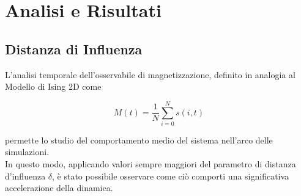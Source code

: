 \documentclass[letterpaper,10pt]{article}
\begin{document}
\section{Analisi e Risultati}
\label{Sec:4}

\subsection{Distanza di Influenza}
\label{Sec:4.1}

L'analisi temporale dell'osservabile di magnetizzazione, definito in analogia al Modello di Ising 2D come

\begin{equation}
M(t) = \dfrac{1}{N} \sum_{i = 0}^{N} s(i,t)
\label{Eq:10}
\end{equation}

permette lo studio del comportamento medio del sistema nell'arco delle simulazioni.
\\ In questo modo, applicando valori sempre maggiori del parametro di distanza d'influenza $\delta$, è stato possibile osservare come ciò comporti una significativa accelerazione della dinamica. 
\end{document}
